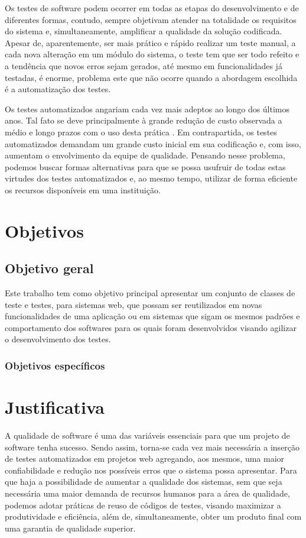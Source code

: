 \documentclass[tg]{mdtufsm}
\begin{document}
Os testes de software podem ocorrer em todas as etapas do desenvolvimento e de diferentes formas, contudo,
sempre objetivam atender na totalidade os requisitos do sistema e, simultaneamente, amplificar a qualidade da solução
codificada. Apesar de, aparentemente, ser mais prático e rápido realizar um teste manual, a cada nova alteração em um módulo do sistema, o teste tem que ser todo refeito e a tendência que novos erros sejam gerados, até mesmo em funcionalidades já testadas, é enorme,
problema este que não ocorre quando a abordagem escolhida é a automatização dos testes. 

Os testes automatizados angariam cada vez mais adeptos ao longo dos últimos anos. Tal fato se deve principalmente à grande redução de custo observada a médio e longo prazos com o uso desta prática \cite{de2007utilizaccao}. Em contrapartida, os testes automatizados demandam um grande custo inicial em sua codificação e, com isso, aumentam o
envolvimento da equipe de qualidade. Pensando nesse problema, podemos buscar formas alternativas para que se possa usufruir de todas estas virtudes dos testes automatizados e, ao mesmo tempo, utilizar de forma eficiente os recursos disponíveis em uma instituição.

\section{Objetivos}

\subsection{Objetivo geral}

Este trabalho tem como objetivo principal apresentar um conjunto de classes de teste e testes, para sistemas web, que possam ser reutilizados em novas funcionalidades de uma aplicação ou em sistemas que sigam os mesmos padrões e comportamento dos softwares para os quais foram desenvolvidos visando agilizar o desenvolvimento dos testes.

\subsubsection{Objetivos específicos}

\section{Justificativa}

A qualidade de software  é uma das variáveis essenciais para que um projeto de software tenha sucesso.
Sendo assim, torna-se cada vez mais necessária a inserção de testes automatizados em projetos web agregando, aos mesmos, uma maior confiabilidade e redução nos possíveis
erros que o sistema possa apresentar. Para que haja a possibilidade de aumentar a qualidade dos sistemas, sem que seja necessária uma maior
demanda de recursos humanos para a área de qualidade, podemos adotar práticas de reuso de códigos de testes, visando
maximizar a produtividade e eficiência, além de, simultaneamente, obter um produto final com uma garantia de qualidade
superior.
\end{document}
